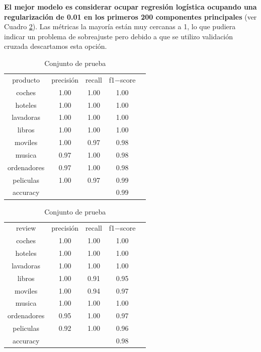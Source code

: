 \documentclass[paper=letter, fontsize=11pt]{scrartcl}
\numberwithin{equation}{section} %
\numberwithin{figure}{section} %
\numberwithin{table}{section} %
\begin{document}
\textbf{El mejor modelo es considerar ocupar regresión logística ocupando una regularización de 0.01 en los primeros 200 componentes principales} (ver Cuadro \ref{metricas_producto}). Las métricas la mayoría están muy cercanas a 1, lo que pudiera indicar un problema de sobreajuste pero debido a que se utilizo validación cruzada descartamos esta opción.
\begin{table}[H]
    \centering 
    \caption{Comparación de métricas en el conjunto de entrenamiento y prueba, Reg Log.} \label{metricas_producto}
\begin{minipage}{.5\linewidth}
        \caption{Conjunto de entrenamiento}
        \centering
        \begin{tabular}{|c|c|c|c|c}
        \hline
producto  & precisión &  recall & f1$-$score\\
      coches & 1.00 &1.00 &1.00\\    
     hoteles & 1.00 &1.00 &1.00\\    
   lavadoras & 1.00 &1.00 &1.00\\
      libros & 1.00 &1.00 &1.00\\
     moviles & 1.00 &0.97 &0.98\\
      musica & 0.97 &1.00 &0.98\\
 ordenadores & 0.97 &1.00 &0.98\\
   peliculas & 1.00 &0.97 &0.99\\ \hline \hline
accuracy  & & & 0.99\\ \hline \hline
        \end{tabular}
    \end{minipage}%
    \begin{minipage}{.5\linewidth}
      \centering
        \caption{Conjunto de prueba}
        \begin{tabular}{|c|c|c|c|c}
        \hline
review  & precisión &  recall & f1$-$score\\
      coches & 1.00 &1.00 &1.00\\    
     hoteles & 1.00 &1.00 &1.00\\    
   lavadoras & 1.00 &1.00 &1.00\\
      libros & 1.00 &0.91 &0.95\\
     moviles & 1.00 &0.94 &0.97\\
      musica & 1.00 &1.00 &1.00\\
 ordenadores & 0.95 &1.00 &0.97\\
   peliculas & 0.92 &1.00 &0.96\\ \hline \hline
accuracy  & & & 0.98\\ \hline \hline
        \end{tabular}
    \end{minipage} 
\end{table}
\end{document}
